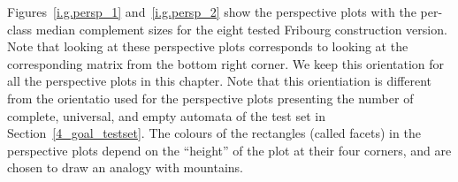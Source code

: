 Figures~\ref{i.g.persp_1} and~\ref{i.g.persp_2} show the perspective plots with the per-class median complement sizes for the eight tested Fribourg construction version. Note that looking at these perspective plots corresponds to looking at the corresponding matrix from the bottom right corner. We keep this orientation for all the perspective plots in this chapter. Note that this orientiation is different from the orientatio used for the perspective plots presenting the number of complete, universal, and empty automata of the \goal{} test set in Section~\ref{4_goal_testset}. The colours of the rectangles (called facets) in the perspective plots depend on the ``height'' of the plot at their four corners, and are chosen to draw an analogy with mountains.

\newcommand{\perspwidth}{0.475}

